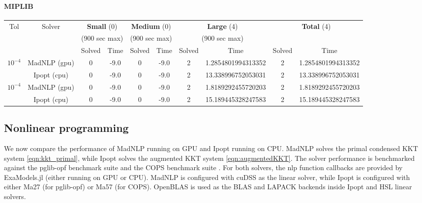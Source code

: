 \documentclass{article}
\begin{document}
\paragraph{MIPLIB}
\begin{center}
  \begin{tabular}{|c|c|cc|cc|cc|cc|}
    \hline
    \multirow{ 3}{*}{Tol} & \multirow{ 3}{*}{Solver} & \multicolumn{2}{c|}{\textbf{Small} (0)}& \multicolumn{2}{c|}{\textbf{Medium} (0)}& \multicolumn{2}{c|}{\textbf{Large} (4)}& \multicolumn{2}{c|}{\multirow{2}{*}{\textbf{Total} (4)}}\\
                          && \multicolumn{2}{c|}{(900 sec max)}& \multicolumn{2}{c|}{(900 sec max)}& \multicolumn{2}{c|}{(900 sec max)}&&\\
                          &&  Solved & Time &  Solved & Time &  Solved & Time &  Solved & Time \\
    \hline
    \multirow{2}{*}{$10^{-4}$} & MadNLP (gpu) & 0 & -9.0 & 0 & -9.0 & 2 & 1.2854801994313352 & 2 & 1.2854801994313352  \\
                          & Ipopt (cpu) & 0 & -9.0 & 0 & -9.0 & 2 & 13.338996752053031 & 2 & 13.338996752053031  \\

    \hline
    \multirow{2}{*}{$10^{-4}$} & MadNLP (gpu) & 0 & -9.0 & 0 & -9.0 & 2 & 1.8189292455720203 & 2 & 1.8189292455720203  \\
                          & Ipopt (cpu) & 0 & -9.0 & 0 & -9.0 & 2 & 15.189445328247583 & 2 & 15.189445328247583  \\

    \hline
  \end{tabular}
\end{center}

\subsection{Nonlinear programming}
We now compare the performance of MadNLP running on GPU and Ipopt running on CPU. MadNLP solves the primal condensed KKT system \cref{eqn:kkt_primal}, while Ipopt solves the augmented KKT system \cref{eqn:augmentedKKT}. The solver performance is benchmarked against the pglib-opf benchmark suite \cite{babaeinejadsarookolaeePowerGridLibrary2021} and the COPS benchmark suite \cite{dolanBenchmarkingOptimizationSoftware2001}. For both solvers, the \gls*{nlp} function callbacks are provided by ExaModels.jl (either running on GPU or CPU). MadNLP is configured with cuDSS as the linear solver, while Ipopt is configured with either Ma27 (for pglib-opf) or Ma57 (for COPS). OpenBLAS is used as the BLAS and LAPACK backends inside Ipopt and HSL linear solvers.
\end{document}
